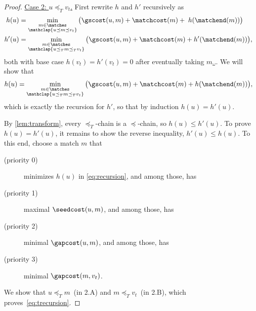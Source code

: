 \begin{proof}
  \underline{Case 2: $u\preceq_T v_t$.} First rewrite $h$ and $h'$ recursively as
  \begin{align}
    \phantom'h(u) &= \min_{\substack{m\in \matches \\ \mathclap{u\preceq m\preceq v_t}}} \big(\gscost(u, m) + \matchcost(m) + \phantom'h(\matchend(m))\big)
    \label{eq:recursion}\\
    h'(u) &= \min_{\substack{m\in \matches \\ \mathclap{u\preceq_T m\preceq_T v_t}}} \big(\gscost(u, m) + \matchcost(m) + h'(\matchend(m))\big),
    \label{eq:recursion2}
  \end{align}
  both with base case $h(v_t){=}h'(v_t)= 0$ after eventually taking $m_\omega$. We will show that
  \begin{equation}
    h(u) = \min_{\substack{m\in \matches\\\mathclap{u\preceq_T m \preceq_T v_t}}} \big(\gscost(u, m) + \matchcost(m) + h(\matchend(m))\big),
    \label{eq:trecursion}
  \end{equation}
  which is exactly the recursion for $h'$, so that by induction $h(u) = h'(u)$.

  By \cref{lem:transform}, every $\preceq_T$-chain is a $\preceq$-chain, so
  $h(u) \leq h'(u)$. To prove $h(u) {=} h'(u)$, it remains to show the reverse
  inequality, $h'(u) \leq h(u)$. To this end, choose a match $m$ that
  \begin{description}%
    \item[(priority 0)] minimizes $h(u)$ in \cref{eq:recursion}, and among those, has
    \item[(priority 1)] maximal $\seedcost(u, m)$, and among those, has
    \item[(priority 2)] minimal $\gapcost(u, m)$, and among those, has
    \item[(priority 3)] minimal $\gapcost(m, v_t)$.
  \end{description}
  We show that $u\preceq_T m$~(in 2.A) and $m\preceq_T v_t$~(in 2.B), which
  proves~\cref{eq:trecursion}.


\end{proof}
